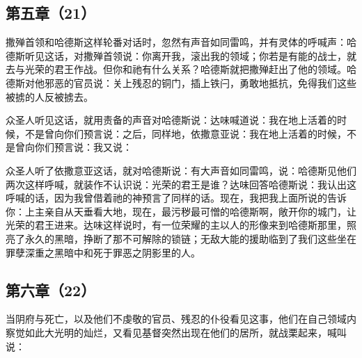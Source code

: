 \subsection{第五章（21）}

撒殚首领和哈德斯这样轮番对话时，忽然有声音如同雷鸣，并有灵体的呼喊声：哈德斯听见这话，对撒殚首领说：你离开我，滚出我的领域；你若是有能的战士，就去与光荣的君王作战。但你和祂有什么关系？哈德斯就把撒殚赶出了他的领域。哈德斯对他邪恶的官员说：关上残忍的铜门，插上铁闩，勇敢地抵抗，免得我们这些被掳的人反被掳去。\par

众圣人听见这话，就用责备的声音对哈德斯说：达味喊道说：我在地上活着的时候，不是曾向你们预言说：之后，同样地，依撒意亚说：我在地上活着的时候，不是曾向你们预言说：我又说：\par

众圣人听了依撒意亚这话，就对哈德斯说：有大声音如同雷鸣，说：哈德斯见他们两次这样呼喊，就装作不认识说：光荣的君王是谁？达味回答哈德斯说：我认出这呼喊的话，因为我曾借着祂的神预言了同样的话。现在，我把我上面所说的告诉你：上主亲自从天垂看大地，现在，最污秽最可憎的哈德斯啊，敞开你的城门，让光荣的君王进来。达味这样说时，有一位荣耀的主以人的形像来到哈德斯那里，照亮了永久的黑暗，挣断了那不可解除的锁链；无敌大能的援助临到了我们这些坐在罪孽深重之黑暗中和死于罪恶之阴影里的人。\par


\subsection{第六章（22）}

当阴府与死亡，以及他们不虔敬的官员、残忍的仆役看见这事，他们在自己领域内察觉如此大光明的灿烂，又看见基督突然出现在他们的居所，就战栗起来，喊叫说：\par

